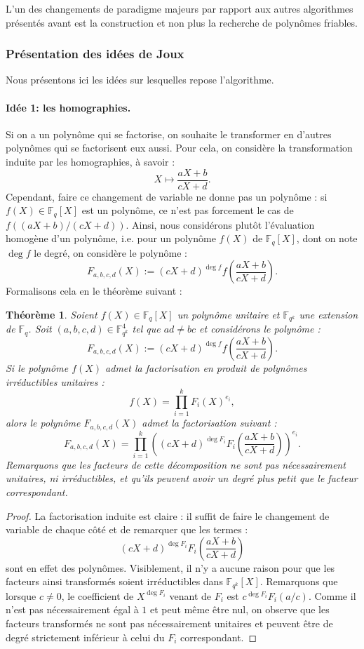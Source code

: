 \documentclass[a4paper, titlepage, 11pt]{article}
\newtheorem{theo}{Théorème}[section]
\theoremstyle{definition}
\theoremstyle{remark}
\def\gf #1{\mathbb{F}_{#1}}
\begin{document}
L'un des changements de paradigme majeurs par rapport aux autres algorithmes présentés avant est la construction et non plus la recherche de polynômes friables.

\subsubsection{Présentation des idées de Joux}\label{ss-sec:idees}

Nous présentons ici les idées sur lesquelles repose l'algorithme.

\paragraph{Idée 1: les homographies.} Si on a un polynôme qui se factorise, on souhaite le transformer en d'autres polynômes qui se factorisent eux aussi. Pour cela, on considère la transformation induite par les homographies, à savoir :
$$X \mapsto \frac{aX+b}{cX+d}.$$
Cependant, faire ce changement de variable ne donne pas un polynôme : si $f(X) \in\gf{q}[X]$ est un polynôme, ce n'est pas forcement le cas de $f((aX+b)/(cX+d))$. Ainsi, nous considérons plutôt l'évaluation homogène d'un polynôme, i.e. pour un polynôme $f(X)$ de $\gf{q}[X]$, dont on note $\deg f$ le degré, on considère le polynôme :
$$F_{a,b,c,d}(X) := (cX+d)^{\deg f} f \left(\frac{aX+b}{cX+d}\right).$$
Formalisons cela en le théorème suivant :
\begin{theo}
Soient $f(X) \in \gf{q}[X]$ un polynôme unitaire et $\gf{q^k}$ une extension de $\gf{q}$. Soit $(a,b,c,d) \in \gf{q^k}^4$ tel que $ad \neq bc$ et considérons le polynôme :
$$F_{a,b,c,d}(X) := (cX+d)^{\deg f} f \left(\frac{aX+b}{cX+d}\right).$$
Si le polynôme $f(X)$ admet la factorisation en produit de polynômes irréductibles unitaires : $$f(X) = \prod_{i=1}^k F_i(X)^{e_i},$$
alors le polynôme $F_{a,b,c,d}(X)$ admet la factorisation suivant :
$$F_{a,b,c,d}(X) = \prod_{i=1}^k {\left( (cX+d)^{\deg F_i} F_i\left(\frac{aX+b}{cX+d}\right)\right)}^{e_i}.$$
Remarquons que les facteurs de cette décomposition ne sont pas nécessairement unitaires, ni irréductibles, et qu'ils peuvent avoir un degré plus petit que le facteur correspondant.
\end{theo}
\begin{proof}
La factorisation induite est claire : il suffit de faire le changement de variable de chaque côté et de remarquer que les termes :
$$(cX+d)^{\deg F_i} F_i\left(\frac{aX+b}{cX+d}\right)$$
sont en effet des polynômes. Visiblement, il n'y a aucune raison pour que les facteurs ainsi transformés soient irréductibles dans $\gf{q^k}[X]$. Remarquons que lorsque $c \neq 0$, le coefficient de $X^{\deg{F_i}}$ venant de $F_i$ est $c^{\deg F_i}F_i(a/c)$. Comme il n'est pas nécessairement égal à $1$ et peut même être nul, on observe que les facteurs transformés ne sont pas nécessairement unitaires et peuvent être de degré strictement inférieur à celui du $F_i$ correspondant.
\end{proof}
\end{document}
